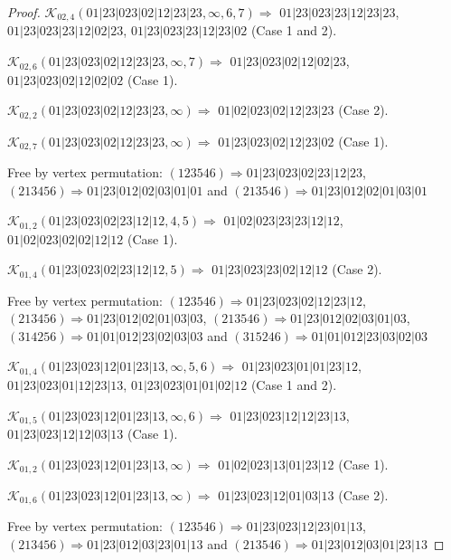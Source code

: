\documentclass[12pt]{article}
\theoremstyle{plain}
\theoremstyle{definition}
\theoremstyle{remark}
\newcommand{\fancy}[1]{\mathcal{#1}}
\def\K{\fancy{K}}
\begin{document}
\begin{proof}
	$\K_{02,4}(01|23|023|02|12|23|23,\infty,6, 7)\Rightarrow $ $01|23|023|23|12|23|23$, $01|23|023|23|12|02|23$, $01|23|023|23|12|23|02$ (Case 1 and 2).
	
	$\K_{02,6}(01|23|023|02|12|23|23,\infty,7)\Rightarrow $ $01|23|023|02|12|02|23$, $01|23|023|02|12|02|02$ (Case 1).
	
	$\K_{02,2}(01|23|023|02|12|23|23,\infty)\Rightarrow $ $01|02|023|02|12|23|23$ (Case 2).
	
	$\K_{02,7}(01|23|023|02|12|23|23,\infty)\Rightarrow $ $01|23|023|02|12|23|02$ (Case 1).
	
	
	
	Free by vertex permutation: $(1 2 3 5 4 6)\Rightarrow 01|23|023|02|23|12|23$, $(2 1 3 4 5 6)\Rightarrow 01|23|012|02|03|01|01$ and $(2 1 3 5 4 6)\Rightarrow 01|23|012|02|01|03|01$
	
	
	
	\bigskip
	
	$\K_{01,2}(01|23|023|02|23|12|12,4, 5)\Rightarrow $ $01|02|023|23|23|12|12$, $01|02|023|02|02|12|12$ (Case 1).
	
	$\K_{01,4}(01|23|023|02|23|12|12,5)\Rightarrow $ $01|23|023|23|02|12|12$ (Case 2).
	
	
	
	Free by vertex permutation: $(1 2 3 5 4 6)\Rightarrow 01|23|023|02|12|23|12$, $(2 1 3 4 5 6)\Rightarrow 01|23|012|02|01|03|03$, $(2 1 3 5 4 6)\Rightarrow 01|23|012|02|03|01|03$, $(3 1 4 2 5 6)\Rightarrow 01|01|012|23|02|03|03$ and $(3 1 5 2 4 6)\Rightarrow 01|01|012|23|03|02|03$
	
	
	
	\bigskip
	
	$\K_{01,4}(01|23|023|12|01|23|13,\infty,5, 6)\Rightarrow $ $01|23|023|01|01|23|12$, $01|23|023|01|12|23|13$, $01|23|023|01|01|02|12$ (Case 1 and 2).
	
	$\K_{01,5}(01|23|023|12|01|23|13,\infty,6)\Rightarrow $ $01|23|023|12|12|23|13$, $01|23|023|12|12|03|13$ (Case 1).
	
	$\K_{01,2}(01|23|023|12|01|23|13,\infty)\Rightarrow $ $01|02|023|13|01|23|12$ (Case 1).
	
	$\K_{01,6}(01|23|023|12|01|23|13,\infty)\Rightarrow $ $01|23|023|12|01|03|13$ (Case 2).
	
	
	
	Free by vertex permutation: $(1 2 3 5 4 6)\Rightarrow 01|23|023|12|23|01|13$, $(2 1 3 4 5 6)\Rightarrow 01|23|012|03|23|01|13$ and $(2 1 3 5 4 6)\Rightarrow 01|23|012|03|01|23|13$
	
	
	

\end{proof}
\end{document}
